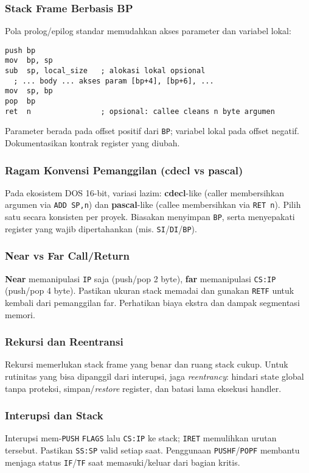 \subsubsection{Stack Frame Berbasis BP}
Pola prolog/epilog standar memudahkan akses parameter dan variabel lokal:
\begin{verbatim}
push bp
mov  bp, sp
sub  sp, local_size   ; alokasi lokal opsional
  ; ... body ... akses param [bp+4], [bp+6], ...
mov  sp, bp
pop  bp
ret  n                ; opsional: callee cleans n byte argumen
\end{verbatim}
Parameter berada pada offset positif dari \texttt{BP}; variabel lokal pada offset negatif. Dokumentasikan kontrak register yang diubah. \cite{intel2019manual32}

\subsubsection{Ragam Konvensi Pemanggilan (cdecl vs pascal)}
Pada ekosistem DOS 16-bit, variasi lazim: \textbf{cdecl}-like (caller membersihkan argumen via \texttt{ADD SP,n}) dan \textbf{pascal}-like (callee membersihkan via \texttt{RET n}). Pilih satu secara konsisten per proyek. Biasakan menyimpan \texttt{BP}, serta menyepakati register yang wajib dipertahankan (mis. \texttt{SI}/\texttt{DI}/\texttt{BP}). \cite{osdev_wiki}

\subsubsection{Near vs Far Call/Return}
\textbf{Near} memanipulasi \texttt{IP} saja (push/pop 2 byte), \textbf{far} memanipulasi \texttt{CS:IP} (push/pop 4 byte). Pastikan ukuran stack memadai dan gunakan \texttt{RETF} untuk kembali dari pemanggilan far. Perhatikan biaya ekstra dan dampak segmentasi memori. \cite{intel2019manual32}

\subsubsection{Rekursi dan Reentransi}
Rekursi memerlukan stack frame yang benar dan ruang stack cukup. Untuk rutinitas yang bisa dipanggil dari interupsi, jaga \textit{reentrancy}: hindari state global tanpa proteksi, simpan/\textit{restore} register, dan batasi lama eksekusi handler. \cite{rbil}

\subsubsection{Interupsi dan Stack}
Interupsi mem-\texttt{PUSH} \texttt{FLAGS} lalu \texttt{CS:IP} ke stack; \texttt{IRET} memulihkan urutan tersebut. Pastikan \texttt{SS:SP} valid setiap saat. Penggunaan \texttt{PUSHF}/\texttt{POPF} membantu menjaga status \texttt{IF}/\texttt{TF} saat memasuki/keluar dari bagian kritis. \cite{rbil}

